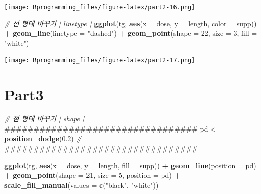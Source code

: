 \documentclass[10pt,]{krantz}
\makeatletter
\newenvironment{Shaded}{\begin{snugshade}}{\end{snugshade}}
\newcommand{\KeywordTok}[1]{\textcolor[rgb]{0.13,0.29,0.53}{\textbf{#1}}}
\newcommand{\DataTypeTok}[1]{\textcolor[rgb]{0.13,0.29,0.53}{#1}}
\newcommand{\DecValTok}[1]{\textcolor[rgb]{0.00,0.00,0.81}{#1}}
\newcommand{\FloatTok}[1]{\textcolor[rgb]{0.00,0.00,0.81}{#1}}
\newcommand{\StringTok}[1]{\textcolor[rgb]{0.31,0.60,0.02}{#1}}
\newcommand{\CommentTok}[1]{\textcolor[rgb]{0.56,0.35,0.01}{\textit{#1}}}
\newcommand{\OperatorTok}[1]{\textcolor[rgb]{0.81,0.36,0.00}{\textbf{#1}}}
\newcommand{\NormalTok}[1]{#1}
\newenvironment{kframe}{%
\medskip{}
\setlength{\fboxsep}{.8em}
 \def\at@end@of@kframe{}%
 \ifinner\ifhmode%
  \def\at@end@of@kframe{\end{minipage}}%
  \begin{minipage}{\columnwidth}%
 \fi\fi%
 \def\FrameCommand##1{\hskip\@totalleftmargin \hskip-\fboxsep
 \colorbox{shadecolor}{##1}\hskip-\fboxsep
     \hskip-\linewidth \hskip-\@totalleftmargin \hskip\columnwidth}%
 \MakeFramed {\advance\hsize-\width
   \@totalleftmargin\z@ \linewidth\hsize
   \@setminipage}}%
 {\par\unskip\endMakeFramed%
 \at@end@of@kframe}
\renewenvironment{Shaded}{\begin{kframe}}{\end{kframe}}
\theoremstyle{definition}
\theoremstyle{definition}
\theoremstyle{remark}
\makeatother
\begin{document}
\texttt{[image: Rprogramming\_files/figure-latex/part2-16.png]}

\begin{Shaded}
\begin{Highlighting}[]


\CommentTok{# 선 형태 바꾸기 [ linetype ]}
\KeywordTok{ggplot}\NormalTok{(tg, }\KeywordTok{aes}\NormalTok{(}\DataTypeTok{x =}\NormalTok{ dose, }\DataTypeTok{y =}\NormalTok{ length, }\DataTypeTok{color =}\NormalTok{ supp)) }\OperatorTok{+}\StringTok{ }\KeywordTok{geom_line}\NormalTok{(}\DataTypeTok{linetype =} \StringTok{"dashed"}\NormalTok{) }\OperatorTok{+}
\StringTok{  }\KeywordTok{geom_point}\NormalTok{(}\DataTypeTok{shape =} \DecValTok{22}\NormalTok{, }\DataTypeTok{size =} \DecValTok{3}\NormalTok{, }\DataTypeTok{fill =} \StringTok{"white"}\NormalTok{)}
\end{Highlighting}
\end{Shaded}

\texttt{[image: Rprogramming\_files/figure-latex/part2-17.png]}

\section{Part3}\label{part3}

\begin{Shaded}
\begin{Highlighting}[]

\CommentTok{# 점 형태 바꾸기 [ shape ]}
\NormalTok{#################################}
\NormalTok{pd <-}\StringTok{ }\KeywordTok{position_dodge}\NormalTok{(}\FloatTok{0.2}\NormalTok{)       }\CommentTok{#}
\NormalTok{#################################}

\KeywordTok{ggplot}\NormalTok{(tg, }\KeywordTok{aes}\NormalTok{(}\DataTypeTok{x =}\NormalTok{ dose, }\DataTypeTok{y =}\NormalTok{ length, }\DataTypeTok{fill =}\NormalTok{ supp)) }\OperatorTok{+}\StringTok{ }\KeywordTok{geom_line}\NormalTok{(}\DataTypeTok{position =}\NormalTok{ pd) }\OperatorTok{+}\StringTok{ }
\StringTok{  }\KeywordTok{geom_point}\NormalTok{(}\DataTypeTok{shape =} \DecValTok{21}\NormalTok{, }\DataTypeTok{size =} \DecValTok{5}\NormalTok{, }\DataTypeTok{position =}\NormalTok{ pd) }\OperatorTok{+}\StringTok{ }
\StringTok{  }\KeywordTok{scale_fill_manual}\NormalTok{(}\DataTypeTok{values =} \KeywordTok{c}\NormalTok{(}\StringTok{"black"}\NormalTok{, }\StringTok{"white"}\NormalTok{))}
\end{Highlighting}
\end{Shaded}
\end{document}
